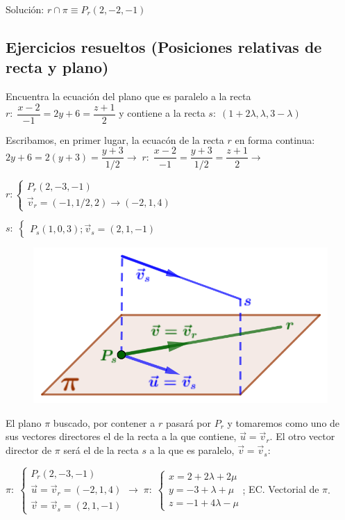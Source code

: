  \noindent Solución: $r \cap \pi \equiv P_r(2,-2,-1)$	

\subsection{Ejercicios resueltos (Posiciones relativas de recta y plano)}

\begin{ejre}
Encuentra la ecuación del plano que es paralelo a la recta $r:\; \dfrac{x-2}{-1}=2y+6=\dfrac{z+1}{2}	$ y contiene a la recta $s:\; (1+2\lambda,\lambda,3-\lambda)$
\end{ejre}
\begin{proofw}\renewcommand{\qedsymbol}{$\diamond$}
Escribamos, en primer lugar, la ecuacón de la recta $r$ en forma continua:	$2y+6=2(y+3)=\dfrac{y+3}{1/2} \to \;r:\; \dfrac{x-2}{-1}=\dfrac{y+3}{1/2}=\dfrac{z+1}{2} \to $

	\begin{multicols}{2}
	\noindent $r:\begin{cases} P_r(2,-3,-1)\\\vec v_r=(-1,1/2,2)\to(-2,1,4) \end{cases}$
	
	\noindent $s:\;\begin{cases} P_s(1,0,3); \vec v_s=(2,1,-1)\end{cases}$

	\begin{figure}[H]
		\centering
		\includegraphics[width=.45\textwidth]{imagenes/imagenes10/T10IM17.png}
 	\end{figure}
 	\end{multicols}

\noindent El plano $\pi$ buscado, por contener a $r$ pasará por $P_r$ y tomaremos como uno de sus vectores directores el de la recta a la que contiene, $\vec u=\vec v_r$. El otro vector director de $\pi$ será el de la recta $s$ a la que es paralelo, $\vec v=\vec v_s$:

\noindent $\pi: \; \begin{cases} P_r(2,-3,-1)\\ \vec u=\vec v_r=(-2,1,4) \\ \vec v=\vec v_s=(2,1,-1) \end{cases} \to \; \pi:\; \begin{cases} x=2+2\lambda+2\mu\\y=-3+\lambda+\mu\\z=-1+4\lambda-\mu \end{cases}$; \tiny{EC. Vectorial de $\pi$}\normalsize{.}

	\end{proofw}
	
